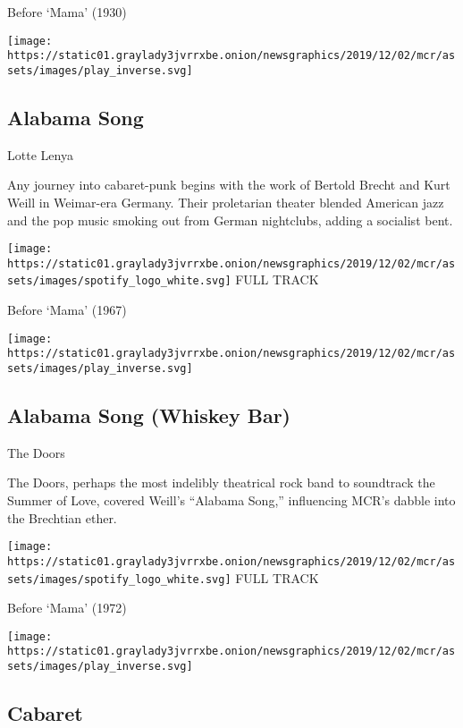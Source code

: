 Before `Mama' (1930)

\texttt{[image: https://static01.graylady3jvrrxbe.onion/newsgraphics/2019/12/02/mcr/assets/images/play\_inverse.svg]}

\hypertarget{alabama-song}{%
\subsection{Alabama Song}\label{alabama-song}}

Lotte Lenya

Any journey into cabaret-punk begins with the work of Bertold Brecht and
Kurt Weill in Weimar-era Germany. Their proletarian theater blended
American jazz and the pop music smoking out from German nightclubs,
adding a socialist bent.

\href{https://open.spotify.com/track/5JSu1S59CChu5KNVKmrVS8?si=m4O3QSOgR9mB-dXylqRP0w}{}

\texttt{[image: https://static01.graylady3jvrrxbe.onion/newsgraphics/2019/12/02/mcr/assets/images/spotify\_logo\_white.svg]}
FULL TRACK

Before `Mama' (1967)

\texttt{[image: https://static01.graylady3jvrrxbe.onion/newsgraphics/2019/12/02/mcr/assets/images/play\_inverse.svg]}

\hypertarget{alabama-song-whiskey-bar}{%
\subsection{Alabama Song (Whiskey Bar)}\label{alabama-song-whiskey-bar}}

The Doors

The Doors, perhaps the most indelibly theatrical rock band to soundtrack
the Summer of Love, covered Weill's ``Alabama Song,'' influencing MCR's
dabble into the Brechtian ether.

\href{https://open.spotify.com/track/0JNZGIavoUrdup1NsgJOQs?si=Jm5IIYmMTguMAwXoyzIlDw}{}

\texttt{[image: https://static01.graylady3jvrrxbe.onion/newsgraphics/2019/12/02/mcr/assets/images/spotify\_logo\_white.svg]}
FULL TRACK

Before `Mama' (1972)

\texttt{[image: https://static01.graylady3jvrrxbe.onion/newsgraphics/2019/12/02/mcr/assets/images/play\_inverse.svg]}

\hypertarget{cabaret}{%
\subsection{Cabaret}\label{cabaret}}

